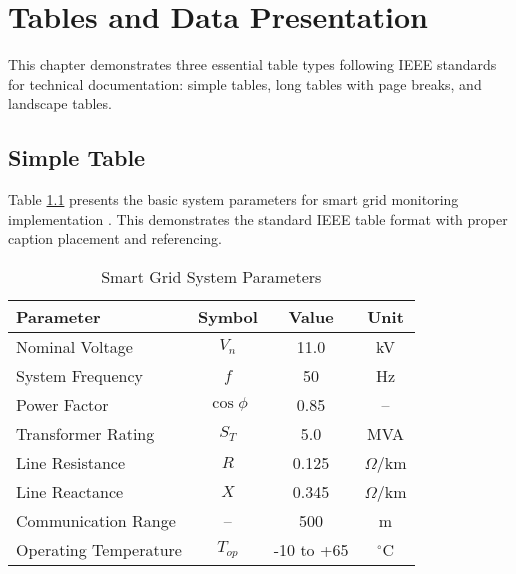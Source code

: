 
\chapter{Tables and Data Presentation}
\label{chap:tables}

This chapter demonstrates three essential table types following IEEE standards for technical documentation: simple tables, long tables with page breaks, and landscape tables.

\section{Simple Table}
\label{sec:simple_table}

Table \ref{tab:system_parameters} presents the basic system parameters for smart grid monitoring implementation \cite{kundur1994power}. This demonstrates the standard IEEE table format with proper caption placement and referencing.

\begin{table}[htbp]
	\centering
	\caption{Smart Grid System Parameters}
	\label{tab:system_parameters}
	\begin{tabular}{|l|c|c|c|}
		\hline
		\textbf{Parameter} & \textbf{Symbol} & \textbf{Value} & \textbf{Unit} \\
		\hline
		Nominal Voltage & $V_n$ & 11.0 & kV \\
		System Frequency & $f$ & 50 & Hz \\
		Power Factor & $\cos\phi$ & 0.85 & -- \\
		Transformer Rating & $S_T$ & 5.0 & MVA \\
		Line Resistance & $R$ & 0.125 & $\Omega$/km \\
		Line Reactance & $X$ & 0.345 & $\Omega$/km \\
		Communication Range & -- & 500 & m \\
		Operating Temperature & $T_{op}$ & -10 to +65 & $^{\circ}$C \\
		\hline
	\end{tabular}
\end{table}

